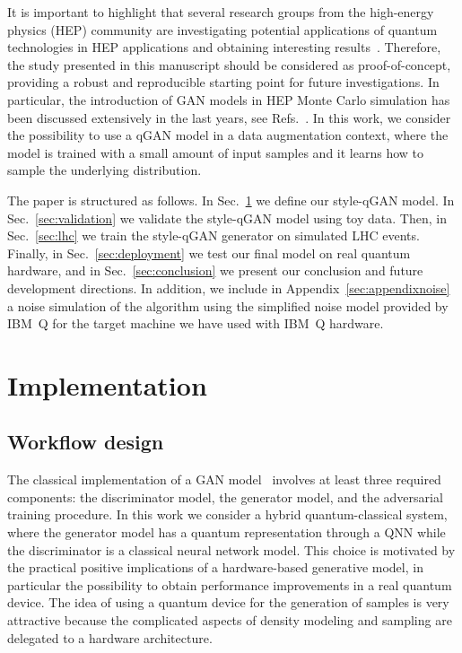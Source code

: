 \documentclass[twocolumn,preprintnumbers,superscriptaddress]{revtex4-2}
\begin{document}
It is important to highlight that several research groups from the high-energy
physics (HEP) community are investigating potential applications of quantum
technologies in HEP applications and obtaining interesting
results~\cite{P_rez_Salinas_2021,Guan_2021,chang2021quantum,Chang_2021,Belis_2021,khattak2021fast}.
Therefore, the study presented in this manuscript should be considered as
proof-of-concept, providing a robust and reproducible starting point for future
investigations. In particular, the introduction of GAN models in HEP Monte Carlo
simulation has been discussed extensively in the last years, see
Refs.~\cite{baldi2021gan,Backes_2021,butter2020generative,Butter_2021,Butter_2020,Bellagente_2020,Butter_2019}.
In this work, we consider the possibility to use a qGAN model in a data
augmentation context, where the model is trained with a small amount of input
samples and it learns how to sample the underlying distribution.


The paper is structured as follows. In Sec.~\ref{sec:implementation} we define our style-qGAN model. In Sec.~\ref{sec:validation} we
validate the style-qGAN model using toy data. Then, in Sec.~\ref{sec:lhc} we train the style-qGAN
generator on simulated LHC events. Finally, in Sec.~\ref{sec:deployment} we test
our final model on real quantum hardware, and in Sec.~\ref{sec:conclusion} we
present our conclusion and future development directions. In addition, we include in Appendix~\ref{sec:appendixnoise} a noise simulation of the algorithm using the simplified noise model provided by IBM~Q for the target machine we have used with IBM~Q hardware.

\section{Implementation}
\label{sec:implementation}

\subsection{Workflow design}

The classical implementation of a GAN model~\cite{goodfellow2014generative}
involves at least three required components: the discriminator model, the
generator model, and the adversarial training procedure. In this work we
consider a hybrid quantum-classical system, where the generator model has a
quantum representation through a QNN while the
discriminator is a classical neural network model. This choice is motivated by
the practical positive implications of a hardware-based generative model, in
particular the possibility to obtain performance improvements in a real quantum
device. The idea of using a quantum device for the generation of
samples is very attractive because the complicated aspects of density modeling and sampling are delegated to a hardware architecture.
\end{document}

